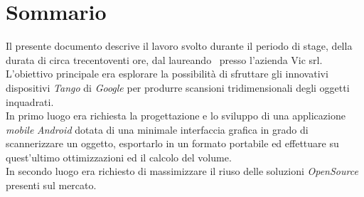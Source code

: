 
\cleardoublepage
{}
{}
\begingroup
\let\clearpage\relax
\let\cleardoublepage\relax
\let\cleardoublepage\relax

\chapter*{Sommario}

Il presente documento descrive il lavoro svolto durante il periodo di stage, della durata di circa trecentoventi ore, dal laureando \myName \ presso l'azienda Vic srl.\\
L'obiettivo principale era esplorare la possibilità di sfruttare gli innovativi dispositivi \emph{Tango} di \emph{Google} per produrre scansioni tridimensionali degli oggetti inquadrati.\\
In primo luogo era richiesta la progettazione e lo sviluppo di una applicazione \emph{mobile} \emph{Android} dotata di una minimale interfaccia grafica in grado di scannerizzare un oggetto, esportarlo in un formato portabile ed effettuare su quest'ultimo ottimizzazioni ed il calcolo del volume.\\
In secondo luogo era richiesto di massimizzare il riuso delle soluzioni \emph{OpenSource} presenti sul mercato. 
%
%

\endgroup			

\vfill

